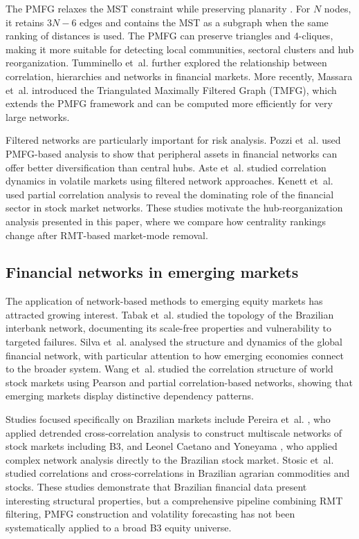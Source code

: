 The PMFG relaxes the MST constraint while preserving planarity \cite{tumminello_2005_tool}. For $N$ nodes, it retains $3N-6$ edges and contains the MST as a subgraph when the same ranking of distances is used. The PMFG can preserve triangles and 4-cliques, making it more suitable for detecting local communities, sectoral clusters and hub reorganization. Tumminello et~al. \cite{tumminello_2010_correlation} further explored the relationship between correlation, hierarchies and networks in financial markets. More recently, Massara et~al. \cite{massara_2016_tmfg} introduced the Triangulated Maximally Filtered Graph (TMFG), which extends the PMFG framework and can be computed more efficiently for very large networks.

Filtered networks are particularly important for risk analysis. Pozzi et~al. \cite{pozzi_2013_spread} used PMFG-based analysis to show that peripheral assets in financial networks can offer better diversification than central hubs. Aste et~al. \cite{aste_2010_correlation} studied correlation dynamics in volatile markets using filtered network approaches. Kenett et~al. \cite{kenett_2012_dominating} used partial correlation analysis to reveal the dominating role of the financial sector in stock market networks. These studies motivate the hub-reorganization analysis presented in this paper, where we compare how centrality rankings change after RMT-based market-mode removal.

\subsection{Financial networks in emerging markets}

The application of network-based methods to emerging equity markets has attracted growing interest. Tabak et~al. \cite{tabak_2010_topology} studied the topology of the Brazilian interbank network, documenting its scale-free properties and vulnerability to targeted failures. Silva et~al. \cite{silva_2016_structure} analysed the structure and dynamics of the global financial network, with particular attention to how emerging economies connect to the broader system. Wang et~al. \cite{wang_2018_correlation} studied the correlation structure of world stock markets using Pearson and partial correlation-based networks, showing that emerging markets display distinctive dependency patterns.

Studies focused specifically on Brazilian markets include Pereira et~al. \cite{pereira_2019_multiscale}, who applied detrended cross-correlation analysis to construct multiscale networks of stock markets including B3, and Leonel Caetano and Yoneyama \cite{leonel_2022_brazilian}, who applied complex network analysis directly to the Brazilian stock market. Stosic et~al. \cite{stosic_2015_correlations} studied correlations and cross-correlations in Brazilian agrarian commodities and stocks. These studies demonstrate that Brazilian financial data present interesting structural properties, but a comprehensive pipeline combining RMT filtering, PMFG construction and volatility forecasting has not been systematically applied to a broad B3 equity universe.

